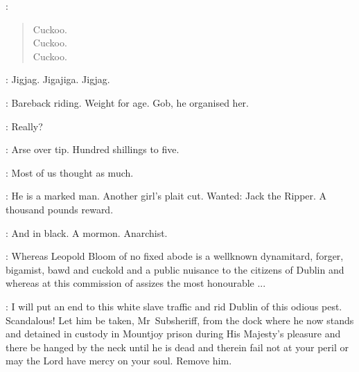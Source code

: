 \Timepiece:
\begin{verse}
    Cuckoo.\\
    Cuckoo.\\
    Cuckoo.
\end{verse}



\Quoits:
Jigjag. Jigajiga. Jigjag.


\NamelessOne:
Bareback riding.
Weight for age.
Gob, he organised her.

\Jurors:
Really?

\NamelessOne:
Arse over tip.
Hundred shillings to five.

\Jurors:
Most of us thought as much.

\FirstWatch:
He is a marked man.
Another girl's plait cut.
Wanted:
Jack the Ripper.
A thousand pounds reward.

\SecondWatch:
And in black.
A mormon.
Anarchist.

\Crier:
Whereas Leopold Bloom of no fixed abode is a wellknown dynamitard,
forger, bigamist, bawd and cuckold
and a public nuisance to the citizens of Dublin
and whereas at this commission of assizes the most honourable ...


\Recorder:
I will put an end to this white slave traffic
and rid Dublin of this odious pest.
Scandalous!
Let him be taken, Mr~Subsheriff, from the dock where he now stands
and detained in custody in Mountjoy prison during His Majesty's pleasure
and there be hanged by the neck until he is dead
and therein fail not at your peril or may the Lord have mercy on your soul.
Remove him.

